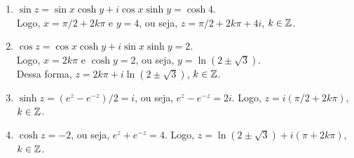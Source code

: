 \begin{questions}
\begin{solution}
\begin{enumerate}[label=(\alph*)]
    \item $\displaystyle \sin z = \sin x \cosh y + i \cos x \sinh y = \cosh 4$.\\
    Logo, $x = \pi/2+2k\pi$ e $y = 4$, ou seja, $z = \pi/2+2k\pi + 4i$, $k\in{\mathbb Z}$.
    
    \item $\displaystyle \cos z = \cos x \cosh y + i \sin x \sinh y = 2$.\\
    Logo, $x = 2k\pi$ e $\cosh y = 2$, ou seja, $y = \ln(2\pm\sqrt{3})$.\\
    Dessa forma, $z = 2k\pi + i \ln(2\pm\sqrt{3})$, $k\in{\mathbb Z}$.
    
    \item $\displaystyle \sinh z = (e^z-e^{-z})/2 = i$, ou seja, $e^z-e^{-z} = 2i$. Logo, $z = i(\pi/2 + 2k\pi)$, $k\in{\mathbb Z}$.
    
    \item $\displaystyle \cosh z = -2$, ou seja, $e^z+e^{-z} = 4$.
    Logo, $z = \ln(2\pm\sqrt{3}) + i(\pi+2k\pi)$, $k\in{\mathbb Z}$.
    
\end{enumerate}
\end{solution}

\end{questions}
